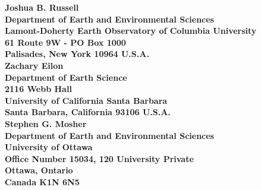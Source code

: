 \documentclass[10pt,titlepage]{article}
\begin{document}
\newpage
{\bfseries\sffamily 
\noindent Joshua B. Russell \\
Department of Earth and Environmental Sciences \\
Lamont-Doherty Earth Observatory of Columbia University \\
61 Route 9W - PO Box 1000 \\
Palisades, New York 10964 U.S.A. \\

\noindent Zachary Eilon \\
Department of Earth Science \\
2116 Webb Hall \\
University of California Santa Barbara \\
Santa Barbara, California 93106 U.S.A. \\

\noindent Stephen G. Mosher \\
Department of Earth and Environmental Sciences \\
University of Ottawa \\
Office Number 15034, 120 University Private \\
Ottawa, Ontario \\
Canada K1N 6N5
}
\newpage
%
%

\end{document}
